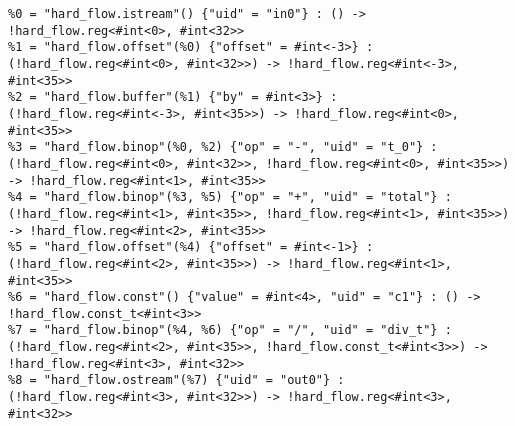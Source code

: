 \renewcommand\theFancyVerbLine{\arabic{FancyVerbLine}}
\makeatletter
{}
\def\dontdofcolorbox{\renewcommand\fcolorbox[4][]{##4}}
\makeatother
\begin{listing}[H]
  \begin{verbatim}
%0 = "hard_flow.istream"() {"uid" = "in0"} : () -> !hard_flow.reg<#int<0>, #int<32>>
%1 = "hard_flow.offset"(%0) {"offset" = #int<-3>} : (!hard_flow.reg<#int<0>, #int<32>>) -> !hard_flow.reg<#int<-3>, #int<35>>
%2 = "hard_flow.buffer"(%1) {"by" = #int<3>} : (!hard_flow.reg<#int<-3>, #int<35>>) -> !hard_flow.reg<#int<0>, #int<35>>
%3 = "hard_flow.binop"(%0, %2) {"op" = "-", "uid" = "t_0"} : (!hard_flow.reg<#int<0>, #int<32>>, !hard_flow.reg<#int<0>, #int<35>>) -> !hard_flow.reg<#int<1>, #int<35>>
%4 = "hard_flow.binop"(%3, %5) {"op" = "+", "uid" = "total"} : (!hard_flow.reg<#int<1>, #int<35>>, !hard_flow.reg<#int<1>, #int<35>>) -> !hard_flow.reg<#int<2>, #int<35>>
%5 = "hard_flow.offset"(%4) {"offset" = #int<-1>} : (!hard_flow.reg<#int<2>, #int<35>>) -> !hard_flow.reg<#int<1>, #int<35>>
%6 = "hard_flow.const"() {"value" = #int<4>, "uid" = "c1"} : () -> !hard_flow.const_t<#int<3>>
%7 = "hard_flow.binop"(%4, %6) {"op" = "/", "uid" = "div_t"} : (!hard_flow.reg<#int<2>, #int<35>>, !hard_flow.const_t<#int<3>>) -> !hard_flow.reg<#int<3>, #int<32>>
%8 = "hard_flow.ostream"(%7) {"uid" = "out0"} : (!hard_flow.reg<#int<3>, #int<32>>) -> !hard_flow.reg<#int<3>, #int<32>>
  \end{verbatim}
  \cprotect\caption{An implementation of a moving average in the \lstinline|hard_flow| dialect}\label{dialect.hard.mvg}
\end{listing}

